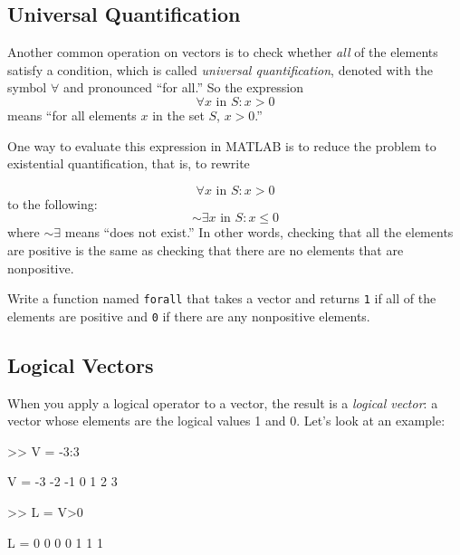 \subsection{Universal Quantification}


Another common operation on vectors is to check whether \emph{all}
of the elements satisfy a condition, which is called \emph{universal quantification}, denoted with
the symbol $\forall$ and pronounced ``for all.''  So the expression %
%
\[ \forall x \mbox{~in~} S: x>0 \]
%
means ``for all elements $x$ in the set $S$, $x>0$.''

One way to evaluate this expression in MATLAB is to reduce the problem to
existential quantification, that is, to rewrite

\begin{equation*}
\forall x \mbox{~in~} S: x>0
\end{equation*}
to the following:
\begin{equation*}
{\sim} \exists x \mbox{~in~} S: x \le 0
\end{equation*}
where ${\sim} \exists$ means ``does not exist.''
In other words, checking that all the  elements are positive is
the same as checking that there are no elements
that are nonpositive.

\begin{ex}
Write a function named \lstinline{forall} that
takes a vector and returns \lstinline{1} if all of the elements are positive
and \lstinline{0} if there are any nonpositive elements.

\end{ex}




\subsection{Logical Vectors}

When you apply a logical operator to a vector, the result is a
\emph{logical vector}: a vector whose elements are the logical
values 1 and 0. Let's look at an  example:


\begin{code}
>> V = -3:3

V = -3    -2    -1     0     1     2     3

>> L = V>0

L =  0     0     0     0     1     1     1
\end{code}

